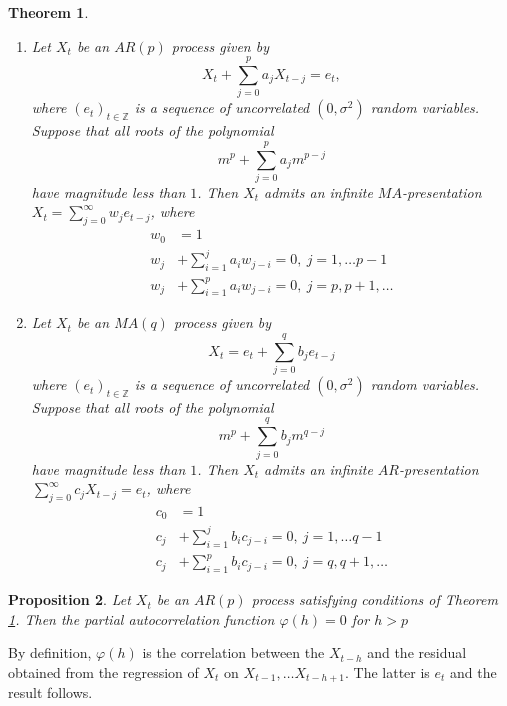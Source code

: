 \documentclass[12pt]{article}
\newtheorem{theorem}{Theorem}[section]
\newtheorem{proposition}[theorem]{Proposition}
\theoremstyle{definition}
\theoremstyle{remark}
\numberwithin{equation}{section}
\newcommand{\ZZ}{\mathbb{Z}}
\begin{document}
\begin{theorem}\label{infARinfMA}
	\begin{enumerate}
	\item
	Let $X_t$ be an $AR(p)$ process given by
	\begin{equation*}
		X_t + \sum_{j = 0}^p a_j X_{t-j} = e_t,
	\end{equation*}
	where $(e_t)_{t\in\ZZ}$ is a sequence of uncorrelated $(0, \sigma^2)$ random variables. Suppose that all roots of the polynomial
	\begin{equation*}
		m^p+\sum_{j = 0}^p a_j m^{p-j}
	\end{equation*}
	have magnitude less than $1$.
	Then $X_t$ admits an infinite $MA$-presentation $X_t = \sum_{j=0}^\infty w_j e_{t-j}$, where
	\begin{align*}
		w_0 &= 1\\
		w_j &+ \sum_{i = 1}^j a_iw_{j-i} = 0,\ j = 1,\ldots p-1\\
		w_j &+ \sum_{i = 1}^p a_iw_{j-i} = 0,\ j = p,p+1,\ldots
	\end{align*}
	\item
	Let $X_t$ be an $MA(q)$ process given by
	\begin{equation*}
		X_t = e_t + \sum_{j = 0}^q b_j e_{t-j}
	\end{equation*}
	where $(e_t)_{t\in\ZZ}$ is a sequence of uncorrelated $(0, \sigma^2)$ random variables. Suppose that all roots of the polynomial
	\begin{equation*}
		m^p+\sum_{j = 0}^q b_j m^{q-j}
	\end{equation*}
	have magnitude less than $1$.
	Then $X_t$ admits an infinite $AR$-presentation $\sum_{j=0}^\infty c_jX_{t-j} =  e_t$, where
	\begin{align*}
		c_0 &= 1\\
		c_j &+ \sum_{i = 1}^j b_ic_{j-i} = 0,\ j = 1,\ldots q-1\\
		c_j &+ \sum_{i = 1}^p b_ic_{j-i} = 0,\ j = q,q+1,\ldots
	\end{align*}
\end{enumerate}
\end{theorem}

\begin{proposition}
	Let $X_t$ be an $AR(p)$ process satisfying conditions of Theorem \ref{infARinfMA}. Then the partial autocorrelation function $\varphi(h) = 0$ for $h > p$
\end{proposition}
\proof By definition, $\varphi(h)$ is the correlation between  the $X_{t-h}$ and the residual obtained from the regression of $X_t$ on $X_{t-1},\ldots X_{t-h+1}$. The latter is $e_t$ and the result follows.
\end{document}
